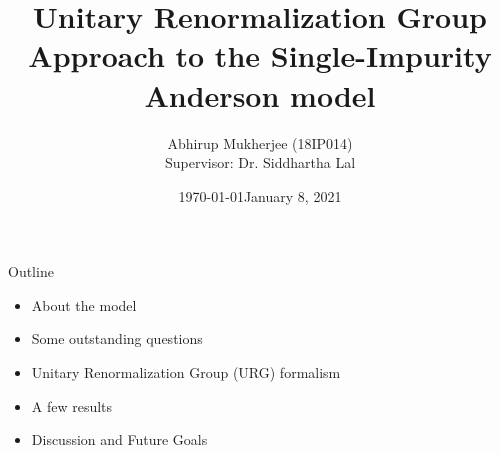 \documentclass[aspectratio=169]{beamer}
\title{Unitary Renormalization Group Approach to the Single-Impurity Anderson model}
\subtitle{}
\date{\today}
\author{Abhirup Mukherjee (18IP014)\\[5mm]{Supervisor: Dr. Siddhartha Lal}}
\institute{IISER Kolkata}
\date{January 8, 2021}
\begin{document}
\begin{frame}
\maketitle
\end{frame}

\begin{frame}{Outline}

\begin{itemize}
  \item About the model
	  \vspace*{10pt}
  \item Some outstanding questions
	  \vspace*{10pt}
  \item Unitary Renormalization Group (URG) formalism
	  \vspace*{10pt}
  \item A few results 
	  \vspace*{10pt}
  \item Discussion and Future Goals
\end{itemize}

\end{frame}
\end{document}
